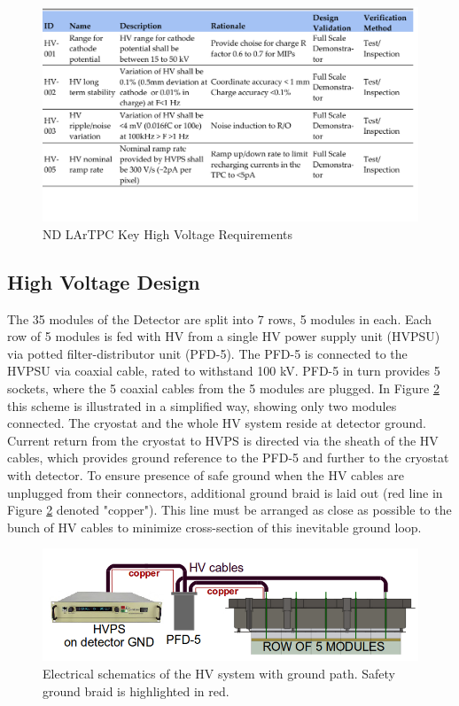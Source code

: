 \begin{figure}
\centering 
\includegraphics[width=1\linewidth]{graphics/lartpc/0Req/NDhvreqs1.pdf}
\caption{\label{fig:lartpc-hv-req1} ND LArTPC Key High Voltage Requirements}
\end{figure}
\subsection{High Voltage Design}

The 35 modules of the Detector are split into 7 rows, 5 modules in each.
Each row of 5 modules is fed with HV from a single HV power supply unit (HVPSU) via potted filter-distributor unit (PFD-5).
The PFD-5 is connected to the HVPSU via coaxial cable, rated to withstand 100 kV. PFD-5 in turn provides 5 sockets, where the 5 coaxial cables from the 5 modules are plugged. In Figure \ref{fig:gndpath} this scheme is illustrated in a simplified way, showing only two modules connected. The cryostat and the whole HV system reside at detector ground. Current return from the cryostat to HVPS is directed via the sheath of the HV cables, which provides ground reference to the PFD-5 and further to the cryostat with detector. To ensure presence of safe ground when the HV cables are unplugged from their connectors, additional ground braid is laid out (red line in Figure \ref{fig:gndpath} denoted "copper"). This line must be arranged as close as possible to the bunch of HV cables to minimize cross-section of this inevitable ground loop.

\begin{figure}[htbp]
\centering 
\includegraphics[width=0.9\linewidth]{graphics/lartpc/HV/GNDs.png}
\caption{\label{fig:gndpath} Electrical schematics of the HV system with ground path. Safety ground braid is highlighted in red.}
\end{figure}


